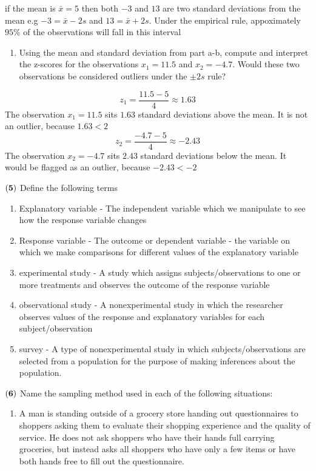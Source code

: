 \documentclass[
]{article}
\providecommand{\tightlist}{%
  \setlength{\itemsep}{0pt}\setlength{\parskip}{0pt}}
\begin{document}
{if the mean is \(\bar{x} = 5\) then both \(-3\) and \(13\) are two
standard deviations from the mean e.g \(-3 = \bar{x}-2s\) and
\(13 = \bar{x}+2s\). Under the empirical rule, appoximately \(95\%\) of
the observations will fall in this interval }

\begin{enumerate}
\def\labelenumi{(\alph{enumi})}
\setcounter{enumi}{2}
\tightlist
\item
  Using the mean and standard deviation from part a-b, compute and
  interpret the z-scores for the observations \(x_1 = 11.5\) and
  \(x_2 = -4.7\). Would these two observations be considered outliers
  under the \(\pm 2s\) rule?
\end{enumerate}

{ \[ z_1 = \frac{11.5 - 5}{4} \approx 1.63 \] The observation
\(x_1 = 11.5\) sits \(1.63\) standard deviations above the mean. It is
not an outlier, because \(1.63 < 2\) } {
\[ z_2 = \frac{-4.7 - 5}{4} \approx -2.43 \] The observation
\(x_2 = -4.7\) sits \(2.43\) standard deviations below the mean. It
would be flagged as an outlier, because \(-2.43 < -2\) }

\(\bf (5)\) Define the following terms

\begin{enumerate}
\def\labelenumi{(\alph{enumi})}
\item
  Explanatory variable - {The independent variable which we manipulate
  to see how the response variable changes}
\item
  Response variable - {The outcome or dependent variable - the variable
  on which we make comparisons for different values of the explanatory
  variable }
\item
  experimental study - {A study which assigns subjects/observations to
  one or more treatments and observes the outcome of the response
  variable }
\item
  observational study - {A nonexperimental study in which the researcher
  observes values of the response and explanatory variables for each
  subject/observation}
\item
  survey - {A type of nonexperimental study in which
  subjects/observations are selected from a population for the purpose
  of making inferences about the population.}
\end{enumerate}

\(\bf (6)\) Name the sampling method used in each of the following
situations:

\begin{enumerate}
\def\labelenumi{(\alph{enumi})}
\tightlist
\item
  A man is standing outside of a grocery store handing out
  questionnaires to shoppers asking them to evaluate their shopping
  experience and the quality of service. He does not ask shoppers who
  have their hands full carrying groceries, but instead asks all
  shoppers who have only a few items or have both hands free to fill out
  the questionnaire.
\end{enumerate}
\end{document}
